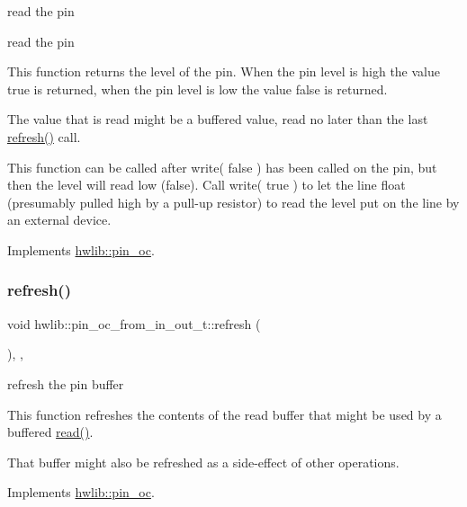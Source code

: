 read the pin

read the pin

This function returns the level of the pin. When the pin level is high the value true is returned, when the pin level is low the value false is returned.

The value that is read might be a buffered value, read no later than the last \hyperlink{classhwlib_1_1pin__oc__from__in__out__t_a99df420aaed9a39dad71658b9483c002}{refresh()} call.

This function can be called after write( false ) has been called on the pin, but then the level will read low (false). Call write( true ) to let the line float (presumably pulled high by a pull-\/up resistor) to read the level put on the line by an external device. 

Implements \hyperlink{classhwlib_1_1pin__oc_a51180afd605add59b96105fa98e29f88}{hwlib\+::pin\+\_\+oc}.

\mbox{\label{classhwlib_1_1pin__oc__from__in__out__t_a99df420aaed9a39dad71658b9483c002}} 
\subsubsection{\texorpdfstring{refresh()}{refresh()}}
{\footnotesize\ttfamily void hwlib\+::pin\+\_\+oc\+\_\+from\+\_\+in\+\_\+out\+\_\+t\+::refresh (\begin{DoxyParamCaption}{ }\end{DoxyParamCaption})\hspace{0.3cm}{\ttfamily [inline]}, {\ttfamily [override]}, {\ttfamily [virtual]}}





refresh the pin buffer

This function refreshes the contents of the read buffer that might be used by a buffered \hyperlink{classhwlib_1_1pin__oc__from__in__out__t_ae1e2dcf630d637e8d31e9942f7323a2b}{read()}.

That buffer might also be refreshed as a side-\/effect of other operations. 

Implements \hyperlink{classhwlib_1_1pin__oc_a573740f6f790c5792efc9cdd44cc73b3}{hwlib\+::pin\+\_\+oc}.

